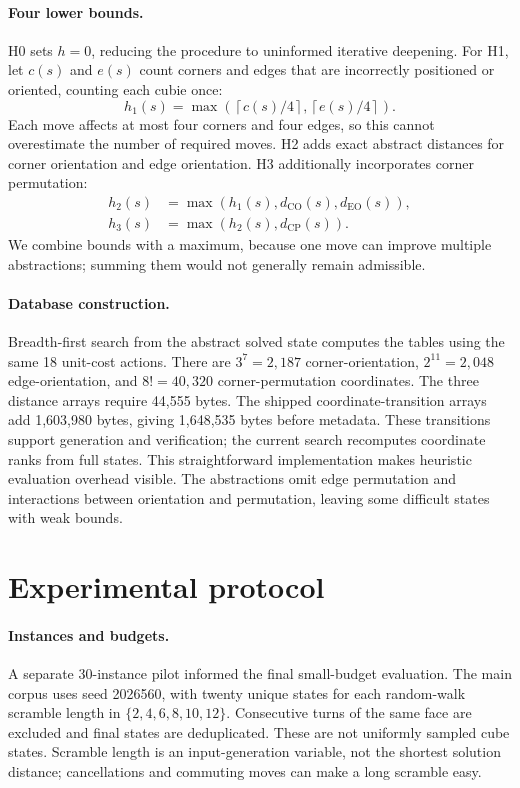 \documentclass{article}
\begin{document}
\paragraph{Four lower bounds.}
H0 sets $h=0$, reducing the procedure to uninformed iterative deepening. For H1, let $c(s)$ and $e(s)$ count corners and edges that are incorrectly positioned or oriented, counting each cubie once:
\begin{equation}
h_1(s)=\max\left(\left\lceil c(s)/4\right\rceil,\left\lceil e(s)/4\right\rceil\right).
\end{equation}
Each move affects at most four corners and four edges, so this cannot overestimate the number of required moves. H2 adds exact abstract distances for corner orientation and edge orientation. H3 additionally incorporates corner permutation:
\begin{align}
h_2(s)&=\max(h_1(s),d_{\mathrm{CO}}(s),d_{\mathrm{EO}}(s)),\\
h_3(s)&=\max(h_2(s),d_{\mathrm{CP}}(s)).
\end{align}
We combine bounds with a maximum, because one move can improve multiple abstractions; summing them would not generally remain admissible.

\paragraph{Database construction.}
Breadth-first search from the abstract solved state computes the tables using the same 18 unit-cost actions. There are $3^7=2,187$ corner-orientation, $2^{11}=2,048$ edge-orientation, and $8!=40,320$ corner-permutation coordinates. The three distance arrays require 44,555 bytes. The shipped coordinate-transition arrays add 1,603,980 bytes, giving 1,648,535 bytes before metadata. These transitions support generation and verification; the current search recomputes coordinate ranks from full states. This straightforward implementation makes heuristic evaluation overhead visible. The abstractions omit edge permutation and interactions between orientation and permutation, leaving some difficult states with weak bounds.

\section{Experimental protocol}
\paragraph{Instances and budgets.}
A separate 30-instance pilot informed the final small-budget evaluation. The main corpus uses seed 2026560, with twenty unique states for each random-walk scramble length in $\{2,4,6,8,10,12\}$. Consecutive turns of the same face are excluded and final states are deduplicated. These are not uniformly sampled cube states. Scramble length is an input-generation variable, not the shortest solution distance; cancellations and commuting moves can make a long scramble easy.
\end{document}
